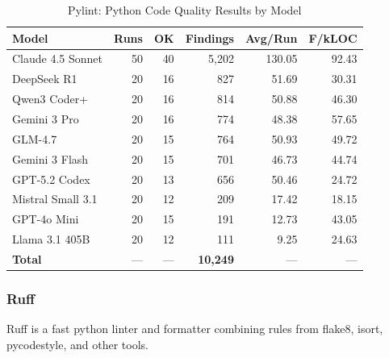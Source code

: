 \begin{table}[htbp]
    \centering
    \caption{Pylint: Python Code Quality Results by Model}
    \label{tab:tool_pylint}
    \small
    \begin{tabular}{@{} l r r r r r @{}}
        \toprule
        \textbf{Model} & \textbf{Runs} & \textbf{OK} & \textbf{Findings} & \textbf{Avg/Run} & \textbf{F/kLOC} \\
        \midrule
        Claude 4.5 Sonnet & 50 & 40 & 5{,}202 & 130.05 & 92.43 \\
        DeepSeek R1 & 20 & 16 & 827 & 51.69 & 30.31 \\
        Qwen3 Coder+ & 20 & 16 & 814 & 50.88 & 46.30 \\
        Gemini 3 Pro & 20 & 16 & 774 & 48.38 & 57.65 \\
        GLM-4.7 & 20 & 15 & 764 & 50.93 & 49.72 \\
        Gemini 3 Flash & 20 & 15 & 701 & 46.73 & 44.74 \\
        GPT-5.2 Codex & 20 & 13 & 656 & 50.46 & 24.72 \\
        Mistral Small 3.1 & 20 & 12 & 209 & 17.42 & 18.15 \\
        GPT-4o Mini & 20 & 15 & 191 & 12.73 & 43.05 \\
        Llama 3.1 405B & 20 & 12 & 111 & 9.25 & 24.63 \\
        \midrule
        \textbf{Total} & --- & --- & \textbf{10{,}249} & --- & --- \\
        \bottomrule
    \end{tabular}
\end{table}

\subsubsection{Ruff}

Ruff is a fast python linter and formatter combining rules from flake8, isort, pycodestyle, and other tools.

